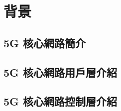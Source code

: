 \chapter{背景}
\label{chapter:background}


\section{5G 核心網路簡介}
\label{sec:5g_core_intro}

\section{5G 核心網路用戶層介紹}
\label{sec:5g_up_intro}


\section{5G 核心網路控制層介紹}
\label{sec:5g_cp_intro}

